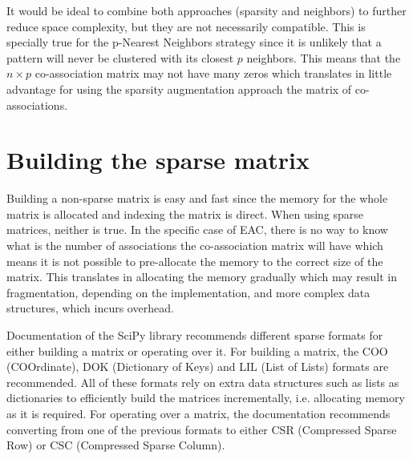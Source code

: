It would be ideal to combine both approaches (sparsity and neighbors) to further reduce space complexity, but they are not necessarily compatible.
This is specially true for the p-Nearest Neighbors strategy since it is unlikely that a pattern will never be clustered with its closest $p$ neighbors.
This means that the $n \times p$ co-association matrix may not have many zeros which translates in little advantage for using the sparsity augmentation approach the matrix of co-associations.

\section{Building the sparse matrix}
\label{sec:sparse coassoc}

Building a non-sparse matrix is easy and fast since the memory for the whole matrix is allocated and indexing the matrix is direct.
When using sparse matrices, neither is true.
In the specific case of EAC, there is no way to know what is the number of associations the co-association matrix will have which means it is not possible to pre-allocate the memory to the correct size of the matrix.
This translates in allocating the memory gradually which may result in fragmentation, depending on the implementation, and more complex data structures, which incurs overhead.


Documentation of the SciPy library recommends different sparse formats for either building a matrix or operating over it.
For building a matrix, the COO (COOrdinate), DOK (Dictionary of Keys) and LIL (List of Lists) formats are recommended.
All of these formats rely on extra data structures such as lists as dictionaries to efficiently build the matrices incrementally, i.e. allocating memory as it is required.
For operating over a matrix, the documentation recommends converting from one of the previous formats to either CSR (Compressed Sparse Row) or CSC (Compressed Sparse Column).

